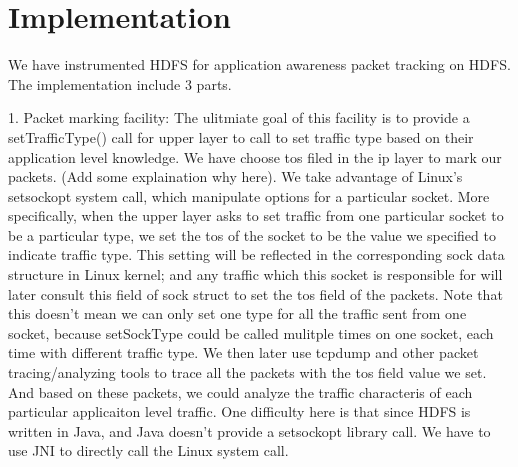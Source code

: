 \section{Implementation}
\label{section:implementation}

We have instrumented HDFS for application awareness packet tracking on HDFS. The implementation include 3 parts. 

1. Packet marking facility:
     The ulitmiate goal of this facility is to provide a setTrafficType() call for upper layer to call to set traffic type based on their application level knowledge. 
      We have choose tos filed in the ip layer  to mark our packets. (Add some explaination why here). We take advantage of Linux's setsockopt system call, which manipulate options for a particular socket. More specifically, when the upper layer asks to set traffic from one particular socket to be a particular type, we set the tos of the socket to be the value we specified to indicate traffic type. This setting will be reflected in the corresponding sock data structure in Linux kernel; and any traffic which this socket is responsible for will later consult this field of sock struct to set the tos field of the packets. Note that this doesn't mean we can only set one type for all the traffic sent from one socket, because setSockType could be called mulitple times on one socket, each time with different traffic type.
       We then later use tcpdump and other packet tracing/analyzing tools to trace all the packets with the tos field value we set. And based on these packets, we could analyze the traffic characteris of each particular applicaiton level traffic. 
        One difficulty here is that since HDFS is written in Java, and Java doesn't provide a setsockopt library call. We have to use JNI to directly call the Linux system call. 

